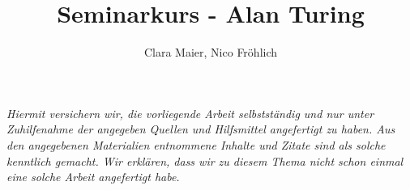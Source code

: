 \documentclass[11pt,a4paper]{article}
\author{Clara Maier, Nico Fröhlich}
\title{Seminarkurs - Alan Turing}
\begin{document}
\maketitle
\newpage
\tableofcontents
\newpage
\emph{Hiermit versichern wir, die vorliegende Arbeit selbstständig und nur unter Zuhilfenahme der angegeben Quellen und Hilfsmittel angefertigt zu haben. Aus den angegebenen Materialien entnommene Inhalte und Zitate sind als solche kenntlich gemacht. Wir erklären, dass wir zu diesem Thema nicht schon einmal eine solche Arbeit angefertigt habe.}
\newpage









\end{document}
